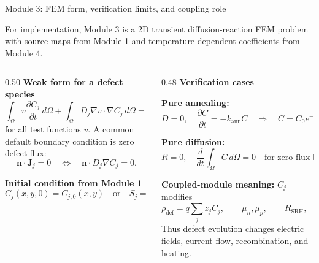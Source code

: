 \documentclass[aspectratio=169,8pt]{beamer}
\newcommand{\Jj}{\bm{J}_j}
\newcommand{\nvec}{\bm{n}}
\newcommand{\OmegaD}{\Omega}
\begin{document}
\begin{frame}{Module 3: FEM form, verification limits, and coupling role}
\scriptsize
\vspace{-1mm}
\begin{bluebox}
\centering\small
For implementation, Module 3 is a 2D transient diffusion-reaction FEM problem with source maps from Module 1 and temperature-dependent coefficients from Module 4.
\end{bluebox}

\vspace{1mm}
\begin{columns}[T,totalwidth=\textwidth]
\begin{column}{0.50\textwidth}
\textbf{Weak form for a defect species}
\begin{equation*}
\boxed{
\int_{\OmegaD} v\frac{\partial C_j}{\partial t}\,d\Omega
+\int_{\OmegaD} D_j\nabla v\cdot\nabla C_j\,d\Omega
=\int_{\OmegaD} v(S_j+R_j)\,d\Omega
}
\end{equation*}
\scriptsize
for all test functions $v$. A common default boundary condition is zero defect flux:
\begin{equation*}
\boxed{\nvec\cdot\Jj=0\quad\Longleftrightarrow\quad \nvec\cdot D_j\nabla C_j=0.}
\end{equation*}

\textbf{Initial condition from Module 1}
\begin{equation*}
\boxed{C_j(x,y,0)=C_{j,0}(x,y)\quad \text{or}\quad S_j=S_j(x,y,t).}
\end{equation*}
\end{column}

\begin{column}{0.48\textwidth}
\textbf{Verification cases}
\begin{greenbox}
\scriptsize
\textbf{Pure annealing:}
\begin{equation*}
D=0,\quad \frac{\partial C}{\partial t}=-k_{\mathrm{ann}}C
\quad\Rightarrow\quad C=C_0e^{-k_{\mathrm{ann}}t}.
\end{equation*}
\end{greenbox}
\vspace{0.7mm}
\begin{greenbox}
\scriptsize
\textbf{Pure diffusion:}
\begin{equation*}
R=0,\quad \frac{d}{dt}\int_{\OmegaD}C\,d\Omega=0
\quad \text{for zero-flux boundaries.}
\end{equation*}
\end{greenbox}
\vspace{0.7mm}
\begin{orangebox}
\scriptsize
\textbf{Coupled-module meaning:} $C_j$ modifies
\begin{equation*}
\rho_{\mathrm{def}}=q\sum_j z_jC_j,
\qquad
\mu_n,\mu_p,
\qquad
R_{\mathrm{SRH}},
\qquad
\dot q_{\mathrm{th}}.
\end{equation*}
Thus defect evolution changes electric fields, current flow, recombination, and heating.
\end{orangebox}
\end{column}
\end{columns}


\end{frame}
\end{document}
